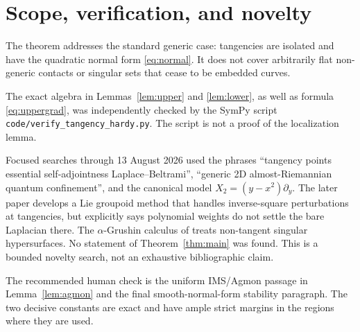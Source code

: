 \documentclass[11pt]{article}
\begin{document}
\section{Scope, verification, and novelty}

The theorem addresses the standard generic case: tangencies are isolated and
have the quadratic normal form \eqref{eq:normal}.  It does not cover
arbitrarily flat non-generic contacts or singular sets that cease to be
embedded curves.

The exact algebra in Lemmas~\ref{lem:upper} and \ref{lem:lower}, as well as
formula \eqref{eq:uppergrad}, was independently checked by the SymPy script
\texttt{code/verify\_tangency\_hardy.py}.  The script is not a proof of the
localization lemma.

Focused searches through 13 August 2026 used the phrases ``tangency points
essential self-adjointness Laplace--Beltrami'', ``generic 2D
almost-Riemannian quantum confinement'', and the canonical model
$X_2=(y-x^2)\partial_y$.  The later paper \cite{Beschastnyi} develops a Lie
groupoid method that handles inverse-square perturbations at tangencies, but
explicitly says polynomial weights do not settle the bare Laplacian there.
The $\alpha$-Grushin calculus of \cite{BQ} treats non-tangent singular
hypersurfaces.  No statement of Theorem~\ref{thm:main} was found.  This is a
bounded novelty search, not an exhaustive bibliographic claim.

The recommended human check is the uniform IMS/Agmon passage in
Lemma~\ref{lem:agmon} and the final smooth-normal-form stability paragraph.
The two decisive constants are exact and have ample strict margins in the
regions where they are used.
\end{document}
